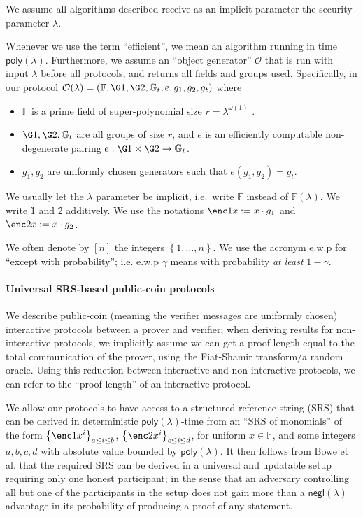 \documentclass[11pt]{article} %
\newcommand{\Gt}{\ensuremath{{\mathbb G}_t}\xspace}
\newcommand{\F}{\ensuremath{\mathbb F}\xspace}
\newcommand{\negl}{\ensuremath{\mathsf{negl}(\lambda)}\xspace}
\newcommand{\defeq}{:=}
\newcommand{\sett}[2]{\ensuremath{\set{#1}_{#2}}\xspace}
\newcommand{\set}[1]{\ensuremath{\left\{#1\right\}}\xspace}
\newcommand{\obgen}{\ensuremath{\mathcal O}\xspace}
\newcommand{\poly}{\ensuremath{\mathsf{poly(\lambda)}}\xspace}
\newcommand{\prg}[1]{ \paragraph{\textbf{#1}}}
\begin{document}
We assume all algorithms described receive as an implicit parameter the security parameter $\lambda$.

Whenever we use the term “efficient”, we mean an algorithm running in time \poly. Furthermore,
we assume an “object generator” \obgen that is run with input $\lambda$ before all protocols, and returns all fields and groups used. Specifically, in our protocol $\obgen(\lambda) = (\F, \G1, \G2, \Gt, e, g_1, g_2,g_t)$ where
\begin{itemize}
\item \F is a prime field of super-polynomial size $r = \lambda^{\omega(1)}$
.
\item $\G1,\G2,\Gt$ are all groups of size $r$, and $e$ is an efficiently computable non-degenerate pairing
$e : \G1 \times \G2 \to \Gt$.
\item $g_1,g_2$ are uniformly chosen generators such that $e(g_1, g_2) = g_t$.
\end{itemize}
We usually let the $\lambda$ parameter be implicit, i.e.\ write \F instead of $\F(\lambda)$.
We write \G1 and \G2 additively. We use the notations $\enc1{x}\defeq x\cdot g_1$ and $\enc2{x}\defeq x\cdot g_2$.

We often denote by $[n]$ the integers \set{1,\ldots,n}.
We use the acronym e.w.p for ``except with probability''; i.e. e.w.p $\gamma$ means with probability \emph{at least} $1-\gamma$.

\prg{Universal SRS-based public-coin protocols}
We describe public-coin (meaning the verifier messages are uniformly chosen) interactive protocols between a prover and verifier; when deriving results for non-interactive protocols, we implicitly assume we can get a proof length equal to the total communication of the prover, using the Fiat-Shamir transform/a random oracle. Using this reduction between interactive and non-interactive protocols, we can refer to the ``proof length'' of an interactive protocol.

We allow our protocols to have access to a structured reference string (SRS) that can be derived in deterministic \poly-time from an ``SRS of monomials'' of the form
\sett{\enc1{x^i}}{a\leq i \leq b}, \sett{\enc2{x^i}}{c\leq i \leq d}, for uniform $x\in \F$,
and some integers $a,b,c,d$ with absolute value bounded by \poly.
It then follows from Bowe et al. \cite{SecondMPC} that the required SRS can be derived in a universal and updatable setup\cite{firstUniversal} requiring only one honest participant; in the sense that an adversary controlling all but one of the participants in the setup does not gain more than a \negl advantage in its probability of producing a proof of any statement.
\end{document}
